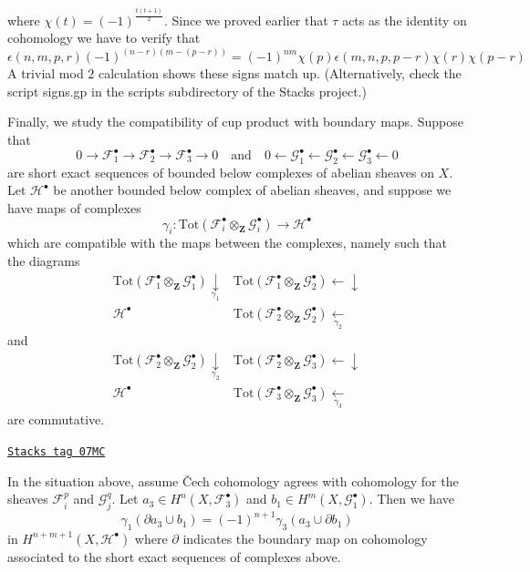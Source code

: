 where $\chi(t) = (-1)^{\frac{t(t + 1)}{2}}$. Since we proved earlier that
$\tau$ acts as the identity on cohomology we have to verify that
$$
\epsilon(n, m, p, r)
(-1)^{(n - r)(m - (p - r))}
=
(-1)^{nm} \chi(p)\epsilon(m, n, p, p - r) \chi(r) \chi(p - r)
$$
A trivial mod $2$ calculation shows these signs match up.
(Alternatively, check the script signs.gp in the scripts subdirectory
of the Stacks project.)

\medskip\noindent
Finally, we study the compatibility of cup product with boundary maps.
Suppose that
$$
0
\to
{\mathcal F}_1^\bullet
\to
{\mathcal F}_2^\bullet
\to
{\mathcal F}_3^\bullet
\to
0
\quad\text{and}\quad
0
\leftarrow
{\mathcal G}_1^\bullet
\leftarrow
{\mathcal G}_2^\bullet
\leftarrow
{\mathcal G}_3^\bullet
\leftarrow
0
$$
are short exact sequences of bounded below complexes of abelian
sheaves on $X$. Let ${\mathcal H}^\bullet$ be another bounded below
complex of abelian sheaves, and suppose we have maps of complexes
$$
\gamma_i :
\text{Tot}({\mathcal F}_i^\bullet \otimes_{\mathbf Z} {\mathcal G}_i^\bullet)
\longrightarrow
{\mathcal H}^\bullet
$$
which are compatible with the maps between the complexes, namely such that
the diagrams
$$
\begin{array}{cc}\text{Tot}({\mathcal F}_1^\bullet \otimes_{\mathbf Z} {\mathcal G}_1^\bullet)
\underset{\gamma_1}{\downarrow} & \text{Tot}({\mathcal F}_1^\bullet \otimes_{\mathbf Z} {\mathcal G}_2^\bullet)
\longleftarrow\downarrow \\ \mathcal{H}^\bullet & \text{Tot}({\mathcal F}_2^\bullet \otimes_{\mathbf Z} {\mathcal G}_2^\bullet)
\underset{\gamma_2}{\longleftarrow}\end{array}
$$
and
$$
\begin{array}{cc}\text{Tot}({\mathcal F}_2^\bullet \otimes_{\mathbf Z} {\mathcal G}_2^\bullet)
\underset{\gamma_2}{\downarrow} & \text{Tot}({\mathcal F}_2^\bullet \otimes_{\mathbf Z} {\mathcal G}_3^\bullet)
\longleftarrow\downarrow \\ \mathcal{H}^\bullet & \text{Tot}({\mathcal F}_3^\bullet \otimes_{\mathbf Z} {\mathcal G}_3^\bullet)
\underset{\gamma_3}{\longleftarrow}\end{array}
$$
are commutative.

\begin{lemma}
\label{cohomology-lemma-compute-sign-cup-product-boundaries}
\href{https://stacks.math.columbia.edu/tag/07MC}{\texttt{Stacks tag 07MC}}

In the situation above, assume {\v C}ech cohomology agrees with cohomology
for the sheaves $\mathcal{F}_i^p$ and $\mathcal{G}_j^q$.
Let $a_3 \in H^n(X, \mathcal{F}_3^\bullet)$ and
$b_1 \in H^m(X, \mathcal{G}_1^\bullet)$. Then we have
$$
\gamma_1( \partial a_3 \cup b_1) =
(-1)^{n + 1} \gamma_3( a_3 \cup \partial b_1)
$$
in $H^{n + m + 1}(X, \mathcal{H}^\bullet)$ where $\partial$ indicates the
boundary map on cohomology associated to the short exact sequences of
complexes above.
\end{lemma}

